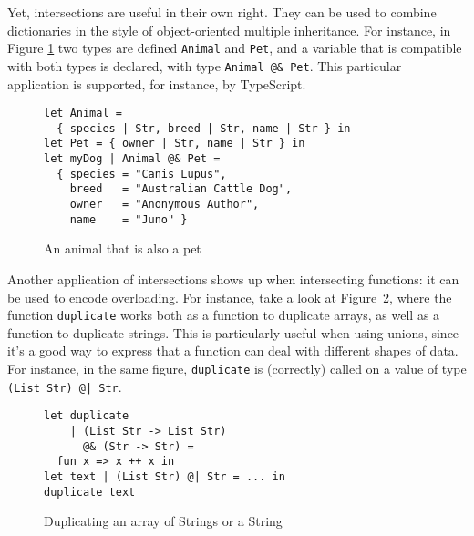 \documentclass[sigplan,10pt,review,anonymous]{acmart}
\newcommand{\unsure}[2][1=]{}
\newcommand{\nickel}[1]{\lstinline[language=nickel]{#1}}
\begin{document}
Yet, intersections are useful in their own right. They can be used to
combine dictionaries in the style of object-oriented multiple inheritance. For instance, in
Figure \ref{fig:intersection-record} two types are defined
\nickel{Animal} and \nickel{Pet}, and a variable that is compatible
with both types is declared, with type \nickel{Animal @& Pet}. This
particular application is supported, for instance, by TypeScript.

\begin{figure}[h]
\begin{lstlisting}[language=nickel]
let Animal =
  { species | Str, breed | Str, name | Str } in
let Pet = { owner | Str, name | Str } in
let myDog | Animal @& Pet =
  { species = "Canis Lupus",
    breed   = "Australian Cattle Dog",
    owner   = "Anonymous Author",
    name    = "Juno" }
\end{lstlisting}
\caption{An animal that is also a pet}
\label{fig:intersection-record}
\end{figure}

\unsure{Maybe it's better to give it in Typescript syntax?
left it commented just in case}



Another application of intersections shows up when intersecting
functions: it can be used to encode overloading.
For instance, take a look at Figure~\ref{fig:intersection-overloading-ex}, where the function
\nickel{duplicate} works both as a function to duplicate
arrays, as well as a function to duplicate strings.
This is particularly useful when using unions, since it's a
good way to express that a function can deal with different
shapes of data.
For instance, in the same figure, \nickel{duplicate} is (correctly) called
on a value of type \nickel{(List Str) @| Str}.

\begin{figure}[h]
\begin{lstlisting}[language=nickel]
let duplicate
    | (List Str -> List Str)
      @& (Str -> Str) =
  fun x => x ++ x in
let text | (List Str) @| Str = ... in
duplicate text
\end{lstlisting}
\caption{Duplicating an array of Strings or a String}
\label{fig:intersection-overloading-ex}
\end{figure}
\end{document}
